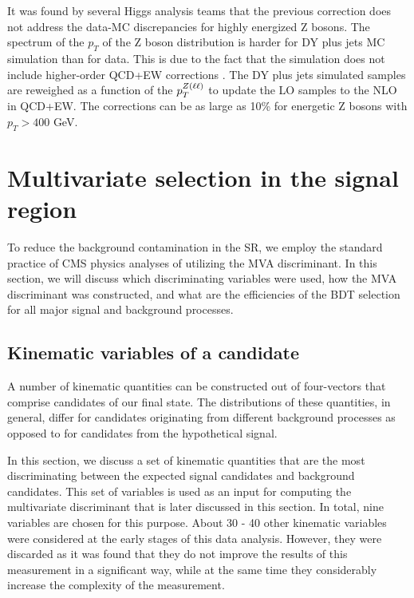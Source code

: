 \begin{itemize}
It was found by several Higgs analysis teams that the previous correction does not address the data-MC discrepancies for highly energized Z bosons. The spectrum of the $p_T$ of the Z boson distribution is harder for DY plus jets MC simulation than for data. This is due to the fact that the simulation does not include higher-order QCD+EW corrections \cite{NLO_Vjets}. The DY plus jets simulated samples are reweighed as a function of the $p_T^{Z(\ell\ell)}$ to update the LO samples to the NLO in QCD+EW. The corrections can be as large as 10\% for energetic Z bosons with $p_T > 400$ GeV.

\end{itemize}

\section{Multivariate selection in the signal region}

To reduce the background contamination in the SR, we employ the standard practice of CMS physics analyses of utilizing the MVA discriminant. In this section, we will discuss which discriminating variables were used, how the MVA discriminant was constructed, and what are the efficiencies of the BDT selection for all major signal and background processes. 
\label{sec:BDT}

\subsection{Kinematic variables of a candidate}
\label{variables}

A number of kinematic quantities can be constructed out of four-vectors that comprise candidates of our final state. The distributions of these quantities, in general, differ for candidates originating from different background processes as opposed to for candidates from the hypothetical signal. 

In this section, we discuss a set of kinematic quantities that are the most discriminating between the expected signal candidates and background candidates. This set of variables is used as an input for computing the multivariate discriminant that is later discussed in this section. In total, nine variables are chosen for this purpose. About 30 - 40 other kinematic variables were considered at the early stages of this data analysis. However, they were discarded as it was found that they do not improve the results of this measurement in a significant way, while at the same time they considerably increase the complexity of the measurement.

